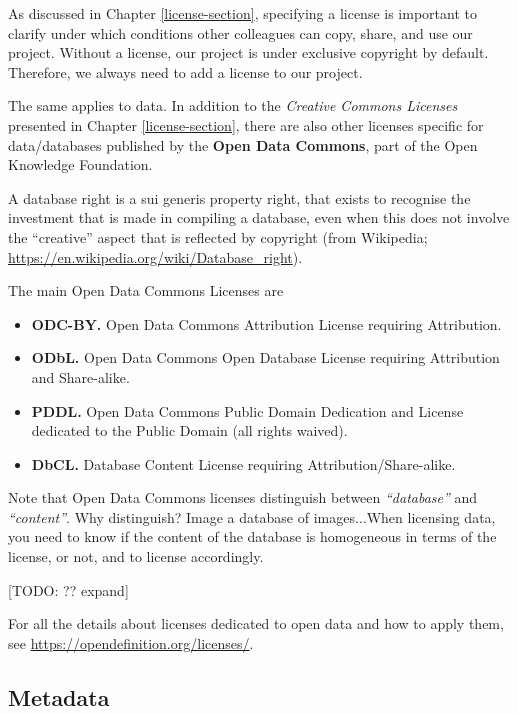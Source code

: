 \documentclass[
  11pt,
]{book}
\providecommand{\tightlist}{%
  \setlength{\itemsep}{0pt}\setlength{\parskip}{0pt}}
\begin{document}
As discussed in Chapter \ref{license-section}, specifying a license is important to clarify under which conditions other colleagues can copy, share, and use our project. Without a license, our project is under exclusive copyright by default. Therefore, we always need to add a license to our project.

The same applies to data. In addition to the \emph{Creative Commons Licenses} presented in Chapter \ref{license-section}, there are also other licenses specific for data/databases published by the \textbf{Open Data Commons}, part of the Open Knowledge Foundation.

A database right is a sui generis property right, that exists to recognise the investment that is made in compiling a database, even when this does not involve the ``creative'' aspect that is reflected by copyright (from Wikipedia; \url{https://en.wikipedia.org/wiki/Database_right}).

The main Open Data Commons Licenses are

\begin{itemize}
\tightlist
\item
  \textbf{ODC-BY.} Open Data Commons Attribution License requiring Attribution.
\item
  \textbf{ODbL.} Open Data Commons Open Database License requiring Attribution and Share-alike.
\item
  \textbf{PDDL.} Open Data Commons Public Domain Dedication and License dedicated to the Public Domain (all rights waived).
\item
  \textbf{DbCL.} Database Content License requiring Attribution/Share-alike.
\end{itemize}

Note that Open Data Commons licenses distinguish between \emph{``database''} and \emph{``content''}.
Why distinguish? Image a database of images\(\ldots\)When licensing data, you need to know if the content of the database is homogeneous in terms of the license, or not, and to license accordingly.

{[}TODO: ?? expand{]}

For all the details about licenses dedicated to open data and how to apply them, see \url{https://opendefinition.org/licenses/}.

\hypertarget{metadata}{%
\subsection{Metadata}\label{metadata}}
\end{document}
